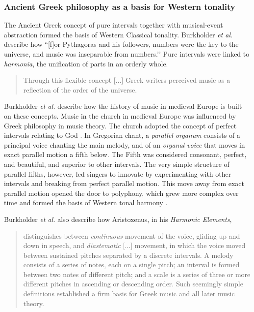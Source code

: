 \subsubsection{Ancient Greek philosophy as a basis for Western tonality}
The Ancient Greek concept of pure intervals together with musical-event abstraction formed the basis of Western Classical tonality. Burkholder \textit{et al.} describe how ``[f]or Pythagoras and his followers, numbers were the key to the universe, and music was inseparable from numbers.’’ Pure intervals were linked to \textit{harmonia}, the unification of parts in an orderly whole. \begin{quotation}Through this flexible concept [...] Greek writers perceived music as a reflection of the order of the universe. \cite[][Ch.~1, p.~13]{burkholder2010history}\end{quotation}

Burkholder \textit{et al.} describe how the history of music in medieval Europe is built on these concepts. Music in the church in medieval Europe was influenced by Greek philosophy in music theory. The church adopted the concept of perfect intervals relating to God \cite[Ch.~2, p.~22]{burkholder2010history}. In Gregorian chant, a \textit{parallel organum} consists of a principal voice chanting the main melody, and of an \textit{organal voice} that moves in exact parallel motion a fifth below. The Fifth was considered consonant, perfect, and beautiful, and superior to other intervals. The very simple structure of parallel fifths, however, led singers to innovate by experimenting with other intervals and breaking from perfect parallel motion. This move away from exact parallel motion opened the door to polyphony, which grew more complex over time and formed the basis of Western tonal harmony \cite[Ch.~5, p.~86]{burkholder2010history}.

Burkholder \textit{et al.} also describe how Aristoxenus, in his \textit{Harmonic Elements}, \begin{quotation}distinguishes between \textit{continuous} movement of the voice, gliding up and down in speech, and \textit{diastematic} [...] movement, in which the voice moved between sustained pitches separated by a discrete intervals. A melody consists of a series of notes, each on a single pitch; an interval is formed between two notes of different pitch; and a scale is a series of three or more different pitches in ascending or descending order. Such seemingly simple definitions established a firm basis for Greek music and all later music theory. \cite[][Ch.~1, p.~15]{burkholder2010history}\end{quotation}

